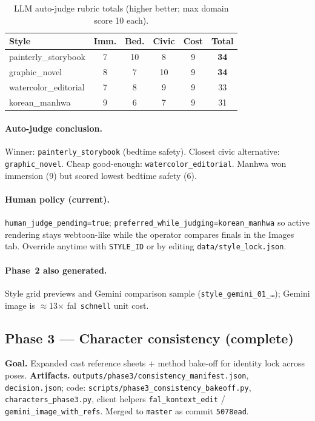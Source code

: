 \documentclass[10pt,twocolumn,letterpaper]{article}
\begin{document}
\begin{table}[t]
\centering
\caption{LLM auto-judge rubric totals (higher better; max domain score 10 each).}
\label{tab:judge}
\small
\begin{tabular}{@{}lccccc@{}}
\toprule
Style & Imm. & Bed. & Civic & Cost & Total \\
\midrule
painterly\_storybook & 7 & 10 & 8 & 9 & \textbf{34} \\
graphic\_novel & 8 & 7 & 10 & 9 & \textbf{34} \\
watercolor\_editorial & 7 & 8 & 9 & 9 & 33 \\
korean\_manhwa & 9 & 6 & 7 & 9 & 31 \\
\bottomrule
\end{tabular}
\end{table}

\paragraph{Auto-judge conclusion.}
Winner: \texttt{painterly\_storybook} (bedtime safety). Closest civic alternative: \texttt{graphic\_novel}. Cheap good-enough: \texttt{watercolor\_editorial}.
Manhwa won immersion (9) but scored lowest bedtime safety (6).

\paragraph{Human policy (current).}
\texttt{human\_judge\_pending=true}; \texttt{preferred\_while\_judging=korean\_manhwa} so active rendering stays webtoon-like while the operator compares finals in the Images tab.
Override anytime with \texttt{STYLE\_ID} or by editing \texttt{data/style\_lock.json}.

\paragraph{Phase~2 also generated.} Style grid previews and Gemini comparison sample (\texttt{style\_gemini\_01\_\ldots}); Gemini image is $\approx$13$\times$ fal~\texttt{schnell} unit cost.

\subsection{Phase 3 --- Character consistency (complete)}
\textbf{Goal.} Expanded cast reference sheets + method bake-off for identity lock across poses.
\textbf{Artifacts.} \texttt{outputs/phase3/consistency\_manifest.json}, \texttt{decision.json}; code: \texttt{scripts/phase3\_consistency\_bakeoff.py}, \texttt{characters\_phase3.py}, client helpers \texttt{fal\_kontext\_edit} / \texttt{gemini\_image\_with\_refs}.
Merged to \texttt{master} as commit \texttt{5078ead}.
\end{document}
